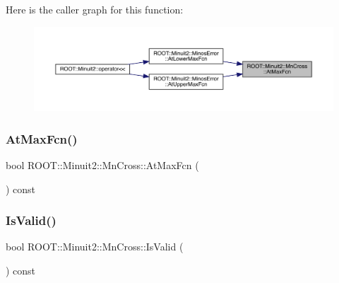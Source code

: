 Here is the caller graph for this function\+:
\nopagebreak
\begin{figure}[H]
\begin{center}
\leavevmode
\includegraphics[width=350pt]{d3/db2/classROOT_1_1Minuit2_1_1MnCross_a785c82249ecae395a16536cfc64aa610_icgraph}
\end{center}
\end{figure}
\mbox{\label{classROOT_1_1Minuit2_1_1MnCross_a785c82249ecae395a16536cfc64aa610}} 
\subsubsection{\texorpdfstring{AtMaxFcn()}{AtMaxFcn()}\hspace{0.1cm}{\footnotesize\ttfamily [3/3]}}
{\footnotesize\ttfamily bool R\+O\+O\+T\+::\+Minuit2\+::\+Mn\+Cross\+::\+At\+Max\+Fcn (\begin{DoxyParamCaption}{ }\end{DoxyParamCaption}) const\hspace{0.3cm}{\ttfamily [inline]}}

\mbox{\label{classROOT_1_1Minuit2_1_1MnCross_a9cee17151ec7e078fc6efbfa32120a1a}} 
\subsubsection{\texorpdfstring{IsValid()}{IsValid()}\hspace{0.1cm}{\footnotesize\ttfamily [1/3]}}
{\footnotesize\ttfamily bool R\+O\+O\+T\+::\+Minuit2\+::\+Mn\+Cross\+::\+Is\+Valid (\begin{DoxyParamCaption}{ }\end{DoxyParamCaption}) const\hspace{0.3cm}{\ttfamily [inline]}}

